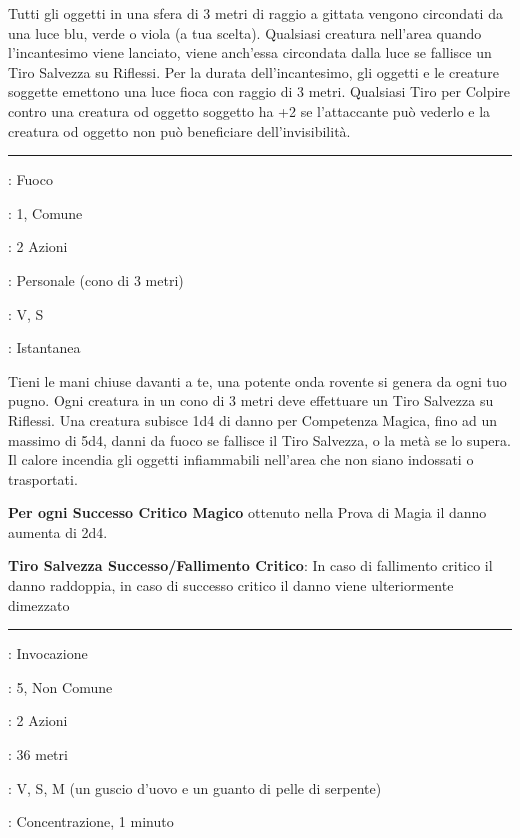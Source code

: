 \begin{multicols}{2}
Tutti gli oggetti in una sfera di 3 metri di raggio a gittata vengono circondati da una luce blu, verde o viola (a tua scelta). Qualsiasi creatura nell'area quando l'incantesimo viene lanciato, viene anch'essa circondata dalla luce se fallisce un Tiro Salvezza su Riflessi. Per la durata dell'incantesimo, gli oggetti e le creature soggette emettono una luce fioca con raggio di 3 metri. Qualsiasi Tiro per Colpire contro una creatura od oggetto soggetto ha +2 se l'attaccante può vederlo e la creatura od oggetto non può beneficiare dell'invisibilità.

\smallskip\noindent\rule{\linewidth}{2pt} \hypertarget{Onda rovente}{}\medskip{}
\noindent
\begin{description}[noitemsep, topsep=0pt, parsep=0pt, partopsep=0pt, leftmargin=0cm, labelwidth=2.8cm]
	\item[\textbf{Lista di Magia}]: Fuoco
	\item[\textbf{Livello}]: 1, Comune
	\item[\textbf{T. di Lancio}]: 2 Azioni
	\item[\textbf{Gittata}]: Personale (cono di 3 metri)
	\item[\textbf{Componenti}]: V, S
	\item[\textbf{Durata}]: Istantanea
\end{description}

Tieni le mani chiuse davanti a te, una potente onda rovente si genera da ogni tuo pugno. Ogni creatura in un cono di 3 metri deve effettuare un Tiro Salvezza su Riflessi. Una creatura subisce 1d4 di danno per Competenza Magica, fino ad un massimo di 5d4, danni da fuoco se fallisce il Tiro Salvezza, o la metà se lo supera. Il calore incendia gli oggetti infiammabili nell'area che non siano indossati o trasportati.

\textbf{Per ogni Successo Critico Magico} ottenuto nella Prova di Magia il danno aumenta di 2d4.

\textbf{Tiro Salvezza Successo/Fallimento Critico}: In caso di fallimento critico il danno raddoppia, in caso di successo critico il danno viene ulteriormente dimezzato

\smallskip\noindent\rule{\linewidth}{2pt} \hypertarget{Mano Arcana}{}\medskip{}
\noindent
\begin{description}[noitemsep, topsep=0pt, parsep=0pt, partopsep=0pt, leftmargin=0cm, labelwidth=2.8cm]
	\item[\textbf{Lista di Magia}]: Invocazione
	\item[\textbf{Livello}]: 5, Non Comune
	\item[\textbf{T. di Lancio}]: 2 Azioni
	\item[\textbf{Gittata}]: 36 metri
	\item[\textbf{Componenti}]: V, S, M (un guscio d'uovo e un guanto di pelle di serpente)
	\item[\textbf{Durata}]: Concentrazione, 1 minuto
\end{description}


\end{multicols}
